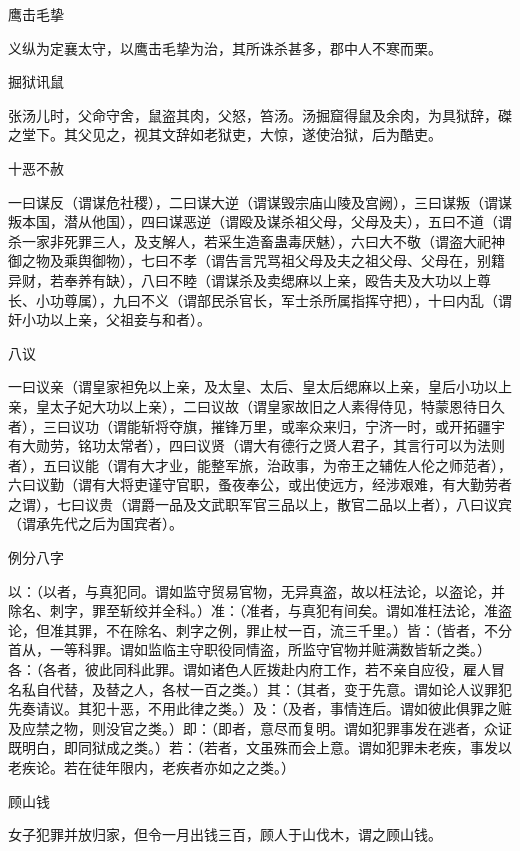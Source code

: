 \documentclass[a4paper,12pt,UTF8,twoside]{ctexbook}
\begin{document}
    鹰击毛挚
    
    义纵为定襄太守，以鹰击毛挚为治，其所诛杀甚多，郡中人不寒而栗。
    
    掘狱讯鼠
    
    张汤儿时，父命守舍，鼠盗其肉，父怒，笞汤。汤掘窟得鼠及余肉，为具狱辞，磔之堂下。其父见之，视其文辞如老狱吏，大惊，遂使治狱，后为酷吏。
    
    十恶不赦
    
    一曰谋反（谓谋危社稷），二曰谋大逆（谓谋毁宗庙山陵及宫阙），三曰谋叛（谓谋叛本国，潜从他国），四曰谋恶逆（谓殴及谋杀祖父母，父母及夫），五曰不道（谓杀一家非死罪三人，及支解人，若采生造畜蛊毒厌魅），六曰大不敬（谓盗大祀神御之物及乘舆御物），七曰不孝（谓告言咒骂祖父母及夫之祖父母、父母在，别籍异财，若奉养有缺），八曰不睦（谓谋杀及卖缌麻以上亲，殴告夫及大功以上尊长、小功尊属），九曰不义（谓部民杀官长，军士杀所属指挥守把），十曰内乱（谓奸小功以上亲，父祖妾与和者）。
    
    八议
    
    一曰议亲（谓皇家袒免以上亲，及太皇、太后、皇太后缌麻以上亲，皇后小功以上亲，皇太子妃大功以上亲），二曰议故（谓皇家故旧之人素得侍见，特蒙恩待日久者），三曰议功（谓能斩将夺旗，摧锋万里，或率众来归，宁济一时，或开拓疆宇有大勋劳，铭功太常者），四曰议贤（谓大有德行之贤人君子，其言行可以为法则者），五曰议能（谓有大才业，能整军旅，治政事，为帝王之辅佐人伦之师范者），六曰议勤（谓有大将吏谨守官职，蚤夜奉公，或出使远方，经涉艰难，有大勤劳者之谓），七曰议贵（谓爵一品及文武职军官三品以上，散官二品以上者），八曰议宾（谓承先代之后为国宾者）。
    
    例分八字
    
    以：（以者，与真犯同。谓如监守贸易官物，无异真盗，故以枉法论，以盗论，并除名、刺字，罪至斩绞并全科。）准：（准者，与真犯有间矣。谓如准枉法论，准盗论，但准其罪，不在除名、刺字之例，罪止杖一百，流三千里。）皆：（皆者，不分首从，一等科罪。谓如监临主守职役同情盗，所监守官物并赃满数皆斩之类。）各：（各者，彼此同科此罪。谓如诸色人匠拨赴内府工作，若不亲自应役，雇人冒名私自代替，及替之人，各杖一百之类。）其：（其者，变于先意。谓如论人议罪犯先奏请议。其犯十恶，不用此律之类。）及：（及者，事情连后。谓如彼此俱罪之赃及应禁之物，则没官之类。）即：（即者，意尽而复明。谓如犯罪事发在逃者，众证既明白，即同狱成之类。）若：（若者，文虽殊而会上意。谓如犯罪未老疾，事发以老疾论。若在徒年限内，老疾者亦如之之类。）
    
    顾山钱
    
    女子犯罪并放归家，但令一月出钱三百，顾人于山伐木，谓之顾山钱。
    
\end{document}
